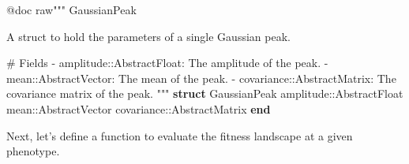 \documentclass[
]{scrartcl}
\newenvironment{Shaded}{\begin{snugshade}}{\end{snugshade}}
\newcommand{\DataTypeTok}[1]{\textcolor[rgb]{0.68,0.00,0.00}{#1}}
\newcommand{\KeywordTok}[1]{\textcolor[rgb]{0.00,0.23,0.31}{\textbf{#1}}}
\newcommand{\NormalTok}[1]{\textcolor[rgb]{0.00,0.23,0.31}{#1}}
\newcommand{\OperatorTok}[1]{\textcolor[rgb]{0.37,0.37,0.37}{#1}}
\newcommand{\PreprocessorTok}[1]{\textcolor[rgb]{0.68,0.00,0.00}{#1}}
\newcommand{\StringTok}[1]{\textcolor[rgb]{0.13,0.47,0.30}{#1}}
\begin{document}
\begin{Shaded}
\begin{Highlighting}[]
\PreprocessorTok{@doc} \StringTok{raw"""}
\StringTok{    GaussianPeak}

\StringTok{A struct to hold the parameters of a single Gaussian peak.}

\StringTok{\# Fields}
\StringTok{{-} \textasciigrave{}amplitude::AbstractFloat\textasciigrave{}: The amplitude of the peak.}
\StringTok{{-} \textasciigrave{}mean::AbstractVector\textasciigrave{}: The mean of the peak.}
\StringTok{{-} \textasciigrave{}covariance::AbstractMatrix\textasciigrave{}: The covariance matrix of the peak.}
\StringTok{"""}
\KeywordTok{struct}\NormalTok{ GaussianPeak}
\NormalTok{    amplitude}\OperatorTok{::}\DataTypeTok{AbstractFloat}
\NormalTok{    mean}\OperatorTok{::}\DataTypeTok{AbstractVector}
\NormalTok{    covariance}\OperatorTok{::}\DataTypeTok{AbstractMatrix}
\KeywordTok{end}
\end{Highlighting}
\end{Shaded}

Next, let's define a function to evaluate the fitness landscape at a
given phenotype.
\end{document}
